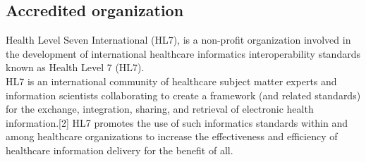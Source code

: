 \subsection{Accredited organization}
Health Level Seven International (HL7), is a non-profit organization involved in the development of international healthcare informatics interoperability standards known as Health Level 7 (HL7).\\
HL7 is an international community of healthcare subject matter experts and information scientists collaborating to create a framework (and related standards) for the exchange, integration, sharing, and retrieval of electronic health information.[2] HL7 promotes the use of such informatics standards within and among healthcare organizations to increase the effectiveness and efficiency of healthcare information delivery for the benefit of all.
\cite{hl7}


